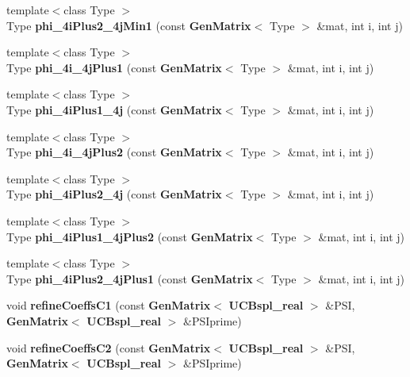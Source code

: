 \begin{DoxyCompactItemize}
\item 
{\footnotesize template$<$class Type $>$ }\\Type {\bfseries phi\_\-4iPlus2\_\-4jMin1} (const {\bf GenMatrix}$<$ Type $>$ \&mat, int i, int j)\label{namespaceUCBspl_a60be46bacf67c7746631a93f86814b09}

\item 
{\footnotesize template$<$class Type $>$ }\\Type {\bfseries phi\_\-4i\_\-4jPlus1} (const {\bf GenMatrix}$<$ Type $>$ \&mat, int i, int j)\label{namespaceUCBspl_ad9727b56aa395627aa920b418d5b0646}

\item 
{\footnotesize template$<$class Type $>$ }\\Type {\bfseries phi\_\-4iPlus1\_\-4j} (const {\bf GenMatrix}$<$ Type $>$ \&mat, int i, int j)\label{namespaceUCBspl_a60c881395945357461282002180058b2}

\item 
{\footnotesize template$<$class Type $>$ }\\Type {\bfseries phi\_\-4i\_\-4jPlus2} (const {\bf GenMatrix}$<$ Type $>$ \&mat, int i, int j)\label{namespaceUCBspl_a651f85db55a0971f3183c20d6de35cb3}

\item 
{\footnotesize template$<$class Type $>$ }\\Type {\bfseries phi\_\-4iPlus2\_\-4j} (const {\bf GenMatrix}$<$ Type $>$ \&mat, int i, int j)\label{namespaceUCBspl_a997437d2260fa4996323e209997b4719}

\item 
{\footnotesize template$<$class Type $>$ }\\Type {\bfseries phi\_\-4iPlus1\_\-4jPlus2} (const {\bf GenMatrix}$<$ Type $>$ \&mat, int i, int j)\label{namespaceUCBspl_a09c2d3efcb82b12d5370f89315f5ce87}

\item 
{\footnotesize template$<$class Type $>$ }\\Type {\bfseries phi\_\-4iPlus2\_\-4jPlus1} (const {\bf GenMatrix}$<$ Type $>$ \&mat, int i, int j)\label{namespaceUCBspl_a9da5325af8e4ea1d2dd48443b83add19}

\item 
void {\bfseries refineCoeffsC1} (const {\bf GenMatrix}$<$ {\bf UCBspl\_\-real} $>$ \&PSI, {\bf GenMatrix}$<$ {\bf UCBspl\_\-real} $>$ \&PSIprime)\label{namespaceUCBspl_a18986ac30f1101c4ed6f0dc31035dba5}

\item 
void {\bfseries refineCoeffsC2} (const {\bf GenMatrix}$<$ {\bf UCBspl\_\-real} $>$ \&PSI, {\bf GenMatrix}$<$ {\bf UCBspl\_\-real} $>$ \&PSIprime)\label{namespaceUCBspl_ac7a32dcd6e589b81d74ce128af996eba}


\end{DoxyCompactItemize}
